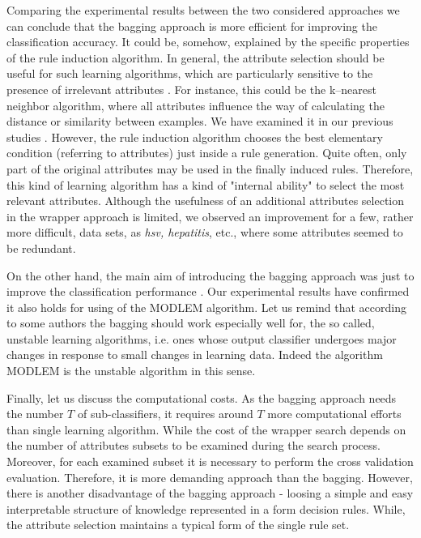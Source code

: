 \documentclass{elsart}
\begin{document}
Comparing the experimental results between the two considered approaches we
can conclude that the bagging approach is more efficient for improving the
classification accuracy. It could be, somehow, explained by the specific
properties of the rule induction algorithm. In general, the attribute
selection should be useful for such learning algorithms, which are
particularly sensitive to the presence of irrelevant attributes
\cite{Kohavi95}. For instance, this could be the k--nearest neighbor
algorithm, where all attributes influence the way of calculating the
distance or similarity between examples. We have examined it in our previous
studies \cite{JelStefKr}. However, the rule induction algorithm chooses the
best elementary condition (referring to attributes) just inside a rule
generation. Quite often, only part of the original attributes may be used in
the finally induced rules. Therefore, this kind of learning algorithm has a
kind of "internal ability"  to select the most relevant attributes. Although
the usefulness of an additional attributes selection in the wrapper approach
is limited, we observed an improvement for a few, rather more difficult,
data sets, as \emph{hsv, hepatitis}, etc., where some attributes seemed to
be redundant.

On the other hand, the main aim of introducing the bagging approach was just
to improve the classification performance \cite{Bre}. Our experimental
results have confirmed it also holds for using of the MODLEM algorithm. Let
us remind that according to some authors \cite{Bre,BK99} the bagging should
work especially well for, the so called, unstable learning algorithms, i.e.
ones whose output classifier undergoes major changes in response to small
changes in learning data. Indeed the algorithm MODLEM is the unstable
algorithm in this sense.

Finally, let us discuss the computational costs. As the bagging approach
needs the number $T$ of sub-classifiers, it requires around $T$ more
computational efforts than single learning algorithm. While the cost of the
wrapper search depends on the number of attributes subsets to be examined
during the search process. Moreover, for each examined subset it is
necessary to perform the cross validation evaluation. Therefore, it is more
demanding approach than the bagging. However, there is another disadvantage
of the bagging approach - loosing a simple and easy interpretable structure
of knowledge represented in a form decision rules. While, the attribute
selection maintains a typical form of the single rule set.
\end{document}
